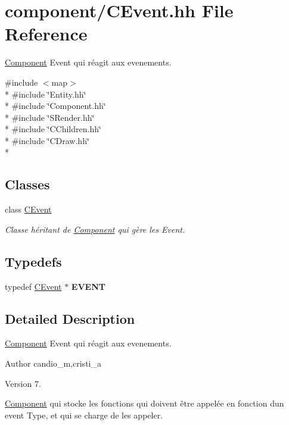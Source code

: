 \hypertarget{_c_event_8hh}{}\section{component/\+C\+Event.hh File Reference}
\label{_c_event_8hh}


\hyperlink{class_component}{Component} Event qui réagit aux evenements.  


{\ttfamily \#include $<$map$>$}\\*
{\ttfamily \#include \char`\"{}Entity.\+hh\char`\"{}}\\*
{\ttfamily \#include \char`\"{}Component.\+hh\char`\"{}}\\*
{\ttfamily \#include \char`\"{}S\+Render.\+hh\char`\"{}}\\*
{\ttfamily \#include \char`\"{}C\+Children.\+hh\char`\"{}}\\*
{\ttfamily \#include \char`\"{}C\+Draw.\+hh\char`\"{}}\\*
\subsection*{Classes}
\begin{DoxyCompactItemize}
\item 
class \hyperlink{class_c_event}{C\+Event}
\begin{DoxyCompactList}\small\item\em Classe héritant de \hyperlink{class_component}{Component} qui gère les Event. \end{DoxyCompactList}\end{DoxyCompactItemize}
\subsection*{Typedefs}
\begin{DoxyCompactItemize}
\item 
\hypertarget{_c_event_8hh_add4f1db1f6d6912ee2bc696065591de3}{}typedef \hyperlink{class_c_event}{C\+Event} $\ast$ {\bfseries E\+V\+E\+N\+T}\label{_c_event_8hh_add4f1db1f6d6912ee2bc696065591de3}

\end{DoxyCompactItemize}


\subsection{Detailed Description}
\hyperlink{class_component}{Component} Event qui réagit aux evenements. 

\begin{DoxyAuthor}{Author}
candio\+\_\+m,cristi\+\_\+a 
\end{DoxyAuthor}
\begin{DoxyVersion}{Version}
7.
\end{DoxyVersion}
\hyperlink{class_component}{Component} qui stocke les fonctions qui doivent être appelée en fonction d\textquotesingle{}un event Type, et qui se charge de les appeler. 